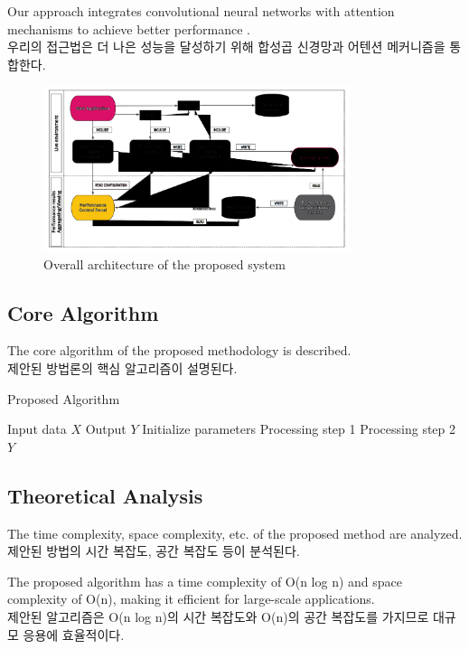 \documentclass[12pt,a4paper]{article}
\begin{document}
Our approach integrates convolutional neural networks with attention mechanisms to achieve better performance \cite{vaswani2017attention}. \\
우리의 접근법은 더 나은 성능을 달성하기 위해 합성곱 신경망과 어텐션 메커니즘을 통합한다.

\begin{figure}[htbp]
    \centering
    \includegraphics[width=0.8\textwidth]{figures/System-overview-Atomia-Performance-Monitoring-system.png}
    \caption{Overall architecture of the proposed system}
    \label{fig:system_overview}
\end{figure}

\subsection{Core Algorithm}
The core algorithm of the proposed methodology is described. \\
제안된 방법론의 핵심 알고리즘이 설명된다.

\begin{algorithm}
\caption{Proposed Algorithm}
\label{alg:proposed}
\begin{algorithmic}[1]
\REQUIRE Input data $X$
\ENSURE Output $Y$
\STATE Initialize parameters
    \STATE Processing step 1
    \STATE Processing step 2
\ENDFOR
\RETURN $Y$
\end{algorithmic}
\end{algorithm}

\subsection{Theoretical Analysis}
The time complexity, space complexity, etc. of the proposed method are analyzed. \\
제안된 방법의 시간 복잡도, 공간 복잡도 등이 분석된다.

The proposed algorithm has a time complexity of O(n log n) and space complexity of O(n), making it efficient for large-scale applications. \\
제안된 알고리즘은 O(n log n)의 시간 복잡도와 O(n)의 공간 복잡도를 가지므로 대규모 응용에 효율적이다.
\end{document}
